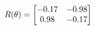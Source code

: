 \documentclass[preview]{standalone}
\begin{document}
\begin{align*}
\special{dvisvgm:raw <g id='unique000'>}R(\theta) = \begin{bmatrix}-0.17 & -0.98\\0.98 & -0.17\end{bmatrix}\special{dvisvgm:raw </g>}
\end{align*}
\end{document}
